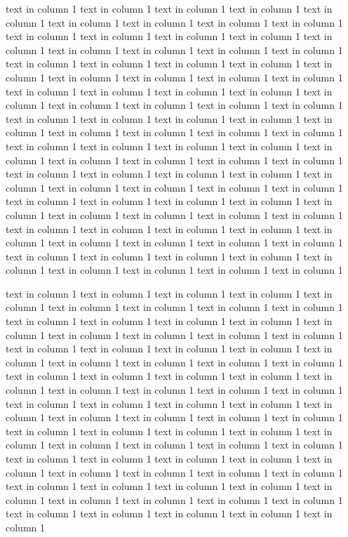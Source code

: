 \documentclass{article}
\begin{document}
 text in column 1  text in column 1  text in column 1  text in column 1  text in column 1  text in column 1  text in column 1  text in column 1  text in column 1  text in column 1  text in column 1  text in column 1  text in column 1  text in column 1  text in column 1  text in column 1  text in column 1  text in column 1  text in column 1  text in column 1  text in column 1  text in column 1  text in column 1  text in column 1  text in column 1  text in column 1  text in column 1  text in column 1  text in column 1  text in column 1  text in column 1  text in column 1  text in column 1  text in column 1  text in column 1  text in column 1  text in column 1  text in column 1  text in column 1  text in column 1  text in column 1  text in column 1  text in column 1  text in column 1  text in column 1  text in column 1  text in column 1  text in column 1  text in column 1  text in column 1  text in column 1  text in column 1  text in column 1  text in column 1  text in column 1  text in column 1  text in column 1  text in column 1  text in column 1  text in column 1  text in column 1  text in column 1  text in column 1  text in column 1  text in column 1  text in column 1  text in column 1  text in column 1  text in column 1  text in column 1  text in column 1  text in column 1  text in column 1  text in column 1  text in column 1  text in column 1  text in column 1  text in column 1  text in column 1  text in column 1  text in column 1  text in column 1  text in column 1  text in column 1  text in column 1  text in column 1  text in column 1  text in column 1  text in column 1  text in column 1

 text in column 1  text in column 1  text in column 1  text in column 1  text in column 1  text in column 1  text in column 1  text in column 1  text in column 1  text in column 1  text in column 1  text in column 1  text in column 1  text in column 1  text in column 1  text in column 1  text in column 1  text in column 1  text in column 1  text in column 1  text in column 1  text in column 1  text in column 1  text in column 1  text in column 1  text in column 1  text in column 1  text in column 1  text in column 1  text in column 1  text in column 1  text in column 1  text in column 1  text in column 1  text in column 1  text in column 1  text in column 1  text in column 1  text in column 1  text in column 1  text in column 1  text in column 1  text in column 1  text in column 1  text in column 1  text in column 1  text in column 1  text in column 1  text in column 1  text in column 1  text in column 1  text in column 1  text in column 1  text in column 1  text in column 1  text in column 1  text in column 1  text in column 1  text in column 1  text in column 1  text in column 1  text in column 1  text in column 1  text in column 1  text in column 1  text in column 1  text in column 1  text in column 1  text in column 1  text in column 1  text in column 1  text in column 1  text in column 1  text in column 1  text in column 1  text in column 1  text in column 1
\end{document}
